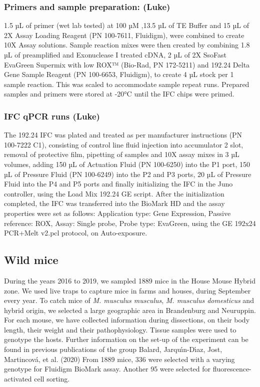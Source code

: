 \documentclass[
]{article}
\begin{document}
\hypertarget{primers-and-sample-preparation-luke}{%
\subsubsection{Primers and sample preparation:
(Luke)}\label{primers-and-sample-preparation-luke}}

1.5 µL of primer (wet lab tested) at 100 µM ,13.5 µL of TE Buffer and 15
µL of 2X Assay Loading Reagent (PN 100-7611, Fluidigm), were combined to
create 10X Assay solutions. Sample reaction mixes were then created by
combining 1.8 µL of preamplified and Exonuclease I treated cDNA, 2 µL of
2X SsoFast EvaGreen Supermix with low ROX™ (Bio-Rad, PN 172-5211) and
192.24 Delta Gene Sample Reagent (PN 100-6653, Fluidigm), to create 4 µL
stock per 1 sample reaction. This was scaled to accommodate sample
repeat runs. Prepared samples and primers were stored at -20°C until the
IFC chips were primed.

\hypertarget{ifc-qpcr-runs-luke}{%
\subsubsection{IFC qPCR runs (Luke)}\label{ifc-qpcr-runs-luke}}

The 192.24 IFC was plated and treated as per manufacturer instructions
(PN 100-7222 C1), consisting of control line fluid injection into
accumulator 2 slot, removal of protective film, pipetting of samples and
10X assay mixes in 3 µL volumes, adding 150 µL of Actuation Fluid (PN
100-6250) into the P1 port, 150 µL of Pressure Fluid (PN 100-6249) into
the P2 and P3 ports, 20 µL of Pressure Fluid into the P4 and P5 ports
and finally initializing the IFC in the Juno controller, using the Load
Mix 192.24 GE script. After the initialization completed, the IFC was
transferred into the BioMark HD and the assay properties were set as
follows: Application type: Gene Expression, Passive reference: ROX,
Assay: Single probe, Probe type: EvaGreen, using the GE 192x24 PCR+Melt
v2.pcl protocol, on Auto-exposure.

\hypertarget{wild-mice}{%
\subsection{Wild mice}\label{wild-mice}}

During the years 2016 to 2019, we sampled 1889 mice in the House Mouse
Hybrid zone. We used live traps to capture mice in farms and houses,
during September every year. To catch mice of \emph{M. musculus
musculus}, \emph{M. musculus domesticus} and hybrid origin, we selected
a large geographic area in Brandenburg and Neuruppin. For each mouse, we
have collected information during dissections, on their body length,
their weight and their pathophysiology. Tissue samples were used to
genotype the hosts. Further information on the set-up of the experiment
can be found in previous publications of the group Balard, Jarquı́n-Dı́az,
Jost, Martincová, et al. (2020) From 1889 mice, 336 were selected with a
varying genotype for Fluidigm BioMark assay. Another 95 were selected
for fluorescence-activated cell sorting.
\end{document}
